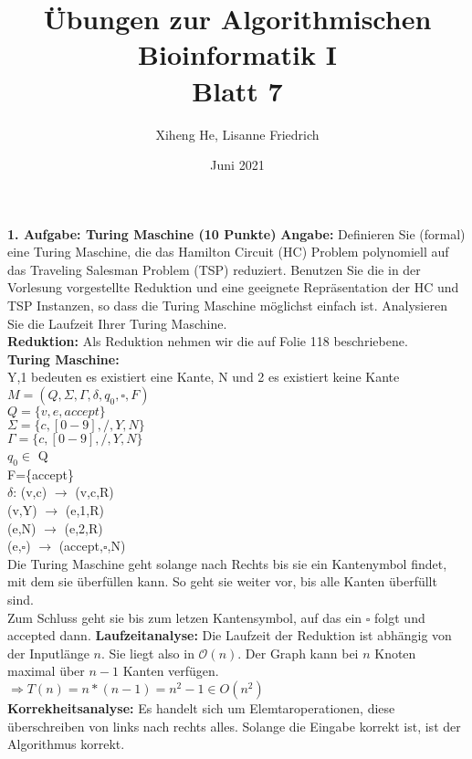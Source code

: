 \documentclass{article}
\title{Übungen zur Algorithmischen Bioinformatik I\\
Blatt 7}
\author{Xiheng He, Lisanne Friedrich}
\date{Juni 2021}
\begin{document}
\maketitle
\begin{flushleft}
\textbf{1. Aufgabe: Turing Maschine (10 Punkte)}
\newline
\textbf{Angabe:}
Definieren Sie (formal) eine Turing Maschine, die das Hamilton Circuit (HC) Problem polynomiell
auf das Traveling Salesman Problem (TSP) reduziert. Benutzen Sie die in der Vorlesung vorgestellte Reduktion und eine geeignete Repräsentation der HC und TSP Instanzen, so dass die Turing
Maschine möglichst einfach ist. Analysieren Sie die Laufzeit Ihrer Turing Maschine.\\
\textbf{Reduktion:}
Als Reduktion nehmen wir die auf Folie 118 beschriebene.\\
\textbf{Turing Maschine: }\\
Y,1 bedeuten es existiert eine Kante, N und 2 es existiert keine Kante\\
$ M=(Q,\Sigma ,\Gamma ,\delta ,q_0,\square,F)$\\
$ Q=\{v,e,accept\}$\\
$\Sigma =\{c,[0-9],/,Y,N\}$\\
$\Gamma =\{c,[0-9],/,Y,N\}$\\
$q_0 \in$ Q\\
F=\{accept\}\\
$\delta$: (v,c) $\rightarrow$ (v,c,R)\\
(v,Y) $\rightarrow$ (e,1,R)\\
(e,N) $\rightarrow$ (e,2,R)\\
(e,$\square$) $\rightarrow$ (accept,$\square$,N)\\
Die Turing Maschine geht solange nach Rechts bis sie ein Kantenymbol findet, mit dem sie überfüllen kann. So geht sie weiter vor, bis alle Kanten überfüllt sind.\\
Zum Schluss geht sie bis zum letzen Kantensymbol, auf das ein $\square$ folgt und accepted dann.
\newpage
\textbf{Laufzeitanalyse:} Die Laufzeit der Reduktion ist abhängig von der Inputlänge $n$. 
Sie liegt also in $\mathcal{O}(n)$. Der Graph kann bei $n$ Knoten maximal über $n-1$ Kanten verfügen. 
$\Rightarrow T(n)=n*(n-1)=n^2-1 \in O(n^2)$ \\
\textbf{Korrekheitsanalyse:} Es handelt sich um Elemtaroperationen, diese überschreiben von links nach rechts alles. Solange die Eingabe korrekt ist, ist der Algorithmus korrekt.
\end{flushleft}
\end{document}
